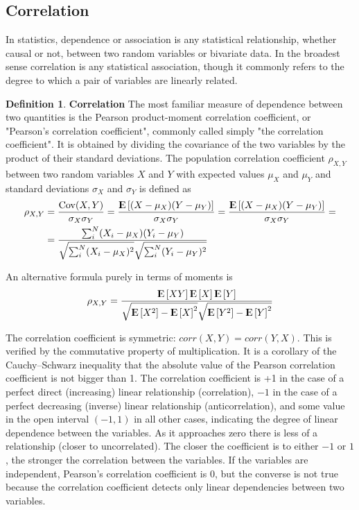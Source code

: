 \documentclass[12pt, letterpaper]{article}
\theoremstyle{definition}
\newtheorem{definition}{Definition}[section]
\newcommand{\E}{{\rm I\kern-.3em E}}
\newcommand{\Cov}{\mathrm{Cov}}
\DeclarePairedDelimiter\autobracket{(}{)}
\newcommand{\br}[1]{\autobracket*{#1}}
\begin{document}
\subsection{Correlation}
In statistics, dependence or association is any statistical relationship, whether causal or not, between two random variables or bivariate data. In the broadest sense correlation is any statistical association, though it commonly refers to the degree to which a pair of variables are linearly related.
\begin{definition}{\textbf{Correlation}}
The most familiar measure of dependence between two quantities is the Pearson product-moment correlation coefficient, or "Pearson's correlation coefficient", commonly called simply "the correlation coefficient". It is obtained by dividing the covariance of the two variables by the product of their standard deviations. The population correlation coefficient $\rho_{X,Y}$ between two random variables $X$ and $Y$ with expected values $\mu_X$ and $\mu_Y$ and standard deviations $\sigma _{X}$ and $\sigma_Y$ is defined as
\begin{equation}
\begin{aligned}
\rho_{X,Y}&= \frac{\Cov(X,Y)}{\sigma_X \sigma_Y} = \frac{\E\left[ \br{X -\mu_X} \br{Y -\mu_Y}\right]}{\sigma_X \sigma_Y} = \frac{\E\left[ \br{X -\mu_X} \br{Y -\mu_Y}\right]}{\sigma_X \sigma_Y} =\\
&= \frac{\sum_i^N \br{X_i -\mu_X} \br{Y_i -\mu_Y}}{\sqrt{\sum_i^N(X_i-\mu_X)^2}\sqrt{\sum_i^N(Y_i-\mu_Y)^2}}
\end{aligned}
\end{equation}

An alternative formula purely in terms of moments is
\begin{equation}
\rho_{X,Y} = \frac{  \E\left[ XY \right]     \E\left[ X \right]   \E\left[ Y \right]   }   {\sqrt{\E\left[ X^2\right]-\E\left[ X\right]^2}                      \sqrt{  \E\left[ Y^2\right] -    \E\left[ Y \right]^2} } 
\end{equation}
\end{definition}
The correlation coefficient is symmetric: $corr(X,Y)=corr (Y,X)$. This is verified by the commutative property of multiplication.
It is a corollary of the Cauchy–Schwarz inequality that the absolute value of the Pearson correlation coefficient is not bigger than 1. The correlation coefficient is +1 in the case of a perfect direct (increasing) linear relationship (correlation), $-1$ in the case of a perfect decreasing (inverse) linear relationship (anticorrelation), and some value in the open interval 
$(-1,1)$ in all other cases, indicating the degree of linear dependence between the variables. As it approaches zero there is less of a relationship (closer to uncorrelated). The closer the coefficient is to either $-1$ or $1$, the stronger the correlation between the variables.
If the variables are independent, Pearson's correlation coefficient is $0$, but the converse is not true because the correlation coefficient detects only linear dependencies between two variables.
\end{document}
